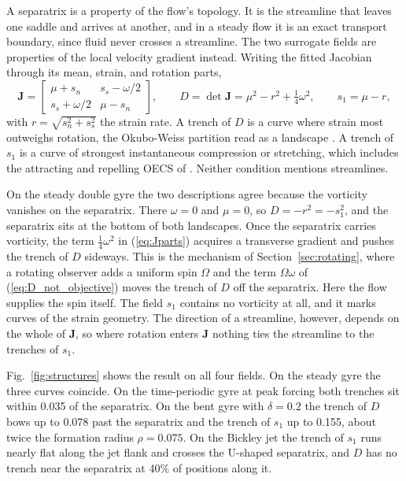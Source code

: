 \documentclass[11pt]{article}
\begin{document}
A separatrix is a property of the flow's topology. It is the streamline
that leaves one saddle and arrives at another, and in a steady flow it is
an exact transport boundary, since fluid never crosses a streamline. The
two surrogate fields are properties of the local velocity gradient
instead. Writing the fitted Jacobian through its mean, strain, and
rotation parts,
\begin{equation}
    \mathbf{J} =
    \begin{bmatrix}
        \mu + s_n & s_s - \omega/2 \\
        s_s + \omega/2 & \mu - s_n
    \end{bmatrix},
    \qquad
    D = \det\mathbf{J} = \mu^2 - r^2 + \tfrac{1}{4}\omega^2,
    \qquad
    s_1 = \mu - r,
    \label{eq:Jparts}
\end{equation}
with $r = \sqrt{s_n^2 + s_s^2}$ the strain rate. A trench of $D$ is a
curve where strain most outweighs rotation, the Okubo-Weiss partition read
as a landscape \cite{8,22}. A trench of $s_1$ is a curve of strongest
instantaneous compression or stretching, which includes the attracting and
repelling OECS of \cite{19}. Neither condition mentions streamlines.

On the steady double gyre the two descriptions agree because the vorticity
vanishes on the separatrix. There $\omega = 0$ and $\mu = 0$, so
$D = -r^2 = -s_1^2$, and the separatrix sits at the bottom of both
landscapes. Once the separatrix carries vorticity, the term
$\tfrac{1}{4}\omega^2$ in (\ref{eq:Jparts}) acquires a transverse gradient
and pushes the trench of $D$ sideways. This is the mechanism of
Section~\ref{sec:rotating}, where a rotating observer adds a uniform spin
$\Omega$ and the term $\Omega\omega$ of (\ref{eq:D_not_objective}) moves
the trench of $D$ off the separatrix. Here the flow supplies the spin
itself. The field $s_1$ contains no vorticity at all, and it marks curves
of the strain geometry. The direction of a streamline, however, depends on
the whole of $\mathbf{J}$, so where rotation enters $\mathbf{J}$ nothing
ties the streamline to the trenches of $s_1$.

Fig.~\ref{fig:structures} shows the result on all four fields. On the
steady gyre the three curves coincide. On the time-periodic gyre at peak
forcing both trenches sit within 0.035 of the separatrix. On the bent
gyre with $\delta = 0.2$ the trench of $D$ bows up to 0.078 past the
separatrix and the trench of $s_1$ up to 0.155, about twice the formation
radius $\rho = 0.075$. On the Bickley jet the trench of $s_1$ runs nearly
flat along the jet flank and crosses the U-shaped separatrix, and $D$ has
no trench near the separatrix at 40\% of positions along it.
\end{document}

